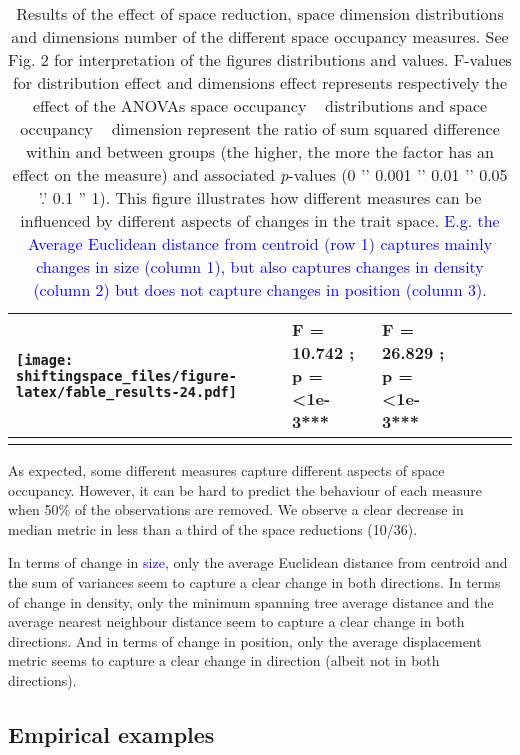 \documentclass[]{article}
\begin{document}
\begin{longtable}[]{@{}llllll@{}}
\begin{minipage}[t]{0.13\columnwidth}
\texttt{[image: shiftingspace\_files/figure-latex/fable\_results-24.pdf]}\strut
\end{minipage} & \begin{minipage}[t]{0.17\columnwidth}\raggedright\strut
F = 10.742 ; p = \textless{}1e-3***\strut
\end{minipage} & \begin{minipage}[t]{0.23333\columnwidth}\raggedright\strut
F = 26.829 ; p = \textless{}1e-3***\strut
\end{minipage}\tabularnewline
\bottomrule
\caption{Results of the effect of space reduction, space dimension
distributions and dimensions number of the different space occupancy
measures. See Fig. 2 for interpretation of the figures distributions and values. F-values for distribution effect and dimensions effect represents respectively the effect of the ANOVAs  space occupancy ~ distributions and space occupancy ~ dimension  represent the ratio of sum squared difference within and between groups (the higher, the more the factor has an effect on the measure) and associated  \textit{p}-values (0 '\*\*\*' 0.001 '\*\*' 0.01 '\*' 0.05 '.' 0.1 '' 1). This figure illustrates how different measures can be influenced by different aspects of changes in the trait space.\textcolor{blue}{ E.g. the Average Euclidean distance from centroid (row 1) captures mainly changes in size (column 1), but also captures changes in density (column 2) but does not capture changes in position (column 3)}.}
\end{longtable}

\renewcommand\baselinestretch{1.6}\selectfont


As expected, some different measures capture different aspects of space
occupancy. However, it can be hard to predict the behaviour of each
measure when 50\% of the observations are removed. We observe a clear
decrease in median metric in less than a third of the space reductions
(10/36).

In terms of change in \textcolor{blue}{size}, only the
average Euclidean distance from centroid and the sum of variances seem
to capture a clear change in both directions. In terms of change in
density, only the minimum spanning tree average distance and the average
nearest neighbour distance seem to capture a clear change in both
directions. And in terms of change in position, only the average
displacement metric seems to capture a clear change in direction (albeit
not in both directions).

\subsection{Empirical examples}\label{empirical-example}
\end{document}
